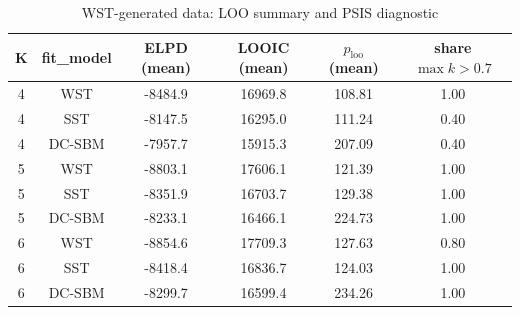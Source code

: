 \begin{table}[!h]
\centering
\caption{WST-generated data: LOO summary and PSIS diagnostic\\\label{tab:wst-loo}}
\centering
\begin{tabular}[t]{cccccc}
\toprule
K & fit_model & ELPD (mean) & LOOIC (mean) & $p_{\text{loo}}$ (mean) & share $\max k > 0.7$\\
\midrule
4 & WST & -8484.9 & 16969.8 & 108.81 & 1.00\\
4 & SST & -8147.5 & 16295.0 & 111.24 & 0.40\\
4 & DC-SBM & -7957.7 & 15915.3 & 207.09 & 0.40\\
5 & WST & -8803.1 & 17606.1 & 121.39 & 1.00\\
5 & SST & -8351.9 & 16703.7 & 129.38 & 1.00\\
5 & DC-SBM & -8233.1 & 16466.1 & 224.73 & 1.00\\
6 & WST & -8854.6 & 17709.3 & 127.63 & 0.80\\
6 & SST & -8418.4 & 16836.7 & 124.03 & 1.00\\
6 & DC-SBM & -8299.7 & 16599.4 & 234.26 & 1.00\\
\bottomrule
\end{tabular}
\end{table}
